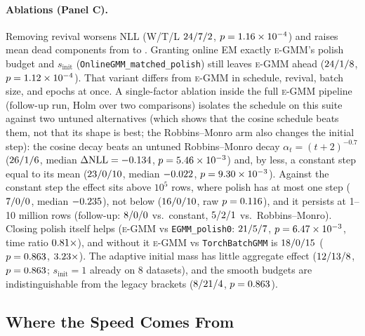\documentclass[10pt]{article} %
\newcommand{\egmm}{\textsc{e-GMM}}
\begin{document}
\paragraph{Ablations (Panel C).} Removing revival worsens NLL (W/T/L $24/7/2$, $p = 1.16\times 10^{-4}$) and raises mean dead components from \rAblDeadEGMM{} to \rAblDeadEGMMnorevival. Granting online EM exactly \egmm{}'s polish budget and $s_{\mathrm{init}}$ (\texttt{OnlineGMM\_matched\_polish}) still leaves \egmm{} ahead ($24/1/8$, $p = 1.12\times 10^{-4}$). That variant differs from \egmm{} in schedule, revival, batch size, and epochs at once. A single-factor ablation inside the full \egmm{} pipeline (follow-up run, Holm over two comparisons) isolates the schedule on this suite against two untuned alternatives (which shows that the cosine schedule beats them, not that its shape is best; the Robbins--Monro arm also changes the initial step): the cosine decay beats an untuned Robbins--Monro decay $\alpha_t = (t+2)^{-0.7}$ ($26/1/6$, median $\Delta\mathrm{NLL} = -0.134$, $p = 5.46\times 10^{-3}$) and, by less, a constant step equal to its mean ($23/0/10$, median $-0.022$, $p = 9.30\times 10^{-3}$). Against the constant step the effect sits above $10^5$ rows, where polish has at most one step ($7/0/0$, median $-0.235$), not below ($16/0/10$, raw $p = 0.116$), and it persists at 1--10 million rows (follow-up: $8/0/0$ vs.\ constant, $5/2/1$ vs.\ Robbins--Monro). Closing polish itself helps (\egmm{} vs \texttt{EGMM\_polish0}: $21/5/7$, $p = 6.47\times 10^{-3}$, time ratio $0.81\times$), and without it \egmm{} vs \texttt{TorchBatchGMM} is $18/0/15$ ($p = 0.863$, $3.23\times$). The adaptive initial mass has little aggregate effect ($12/13/8$, $p = 0.863$; $s_{\mathrm{init}} = 1$ already on 8 datasets), and the smooth budgets are indistinguishable from the legacy brackets ($8/21/4$, $p = 0.863$).

\subsection{Where the Speed Comes From}
\label{sec:speed}
\end{document}
